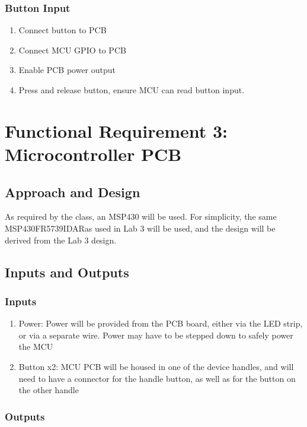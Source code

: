 \documentclass{notes}
\begin{document}
\subsubsection{Button Input}

\begin{enumerate}
    \item Connect button to PCB
    \item Connect MCU GPIO to PCB
    \item Enable PCB power output
    \item Press and release button, ensure MCU can read button input.
\end{enumerate}

\section{Functional Requirement 3: Microcontroller PCB}

\subsection{Approach and Design}

As required by the class, an MSP430 will be used.
For simplicity, the same MSP430FR5739IDAR\footnotemark as used in Lab 3 will be used, and the design will be derived from the Lab 3 design.

\subsection{Inputs and Outputs}

\subsubsection{Inputs}

\begin{enumerate}
    \item Power: Power will be provided from the PCB board, either via the LED strip, or via a separate wire. Power may have to be stepped down to safely power the MCU
    \item Button x2: MCU PCB will be housed in one of the device handles, and will need to have a connector for the handle button, as well as for the button on the other handle
\end{enumerate}

\subsubsection{Outputs}
\end{document}
